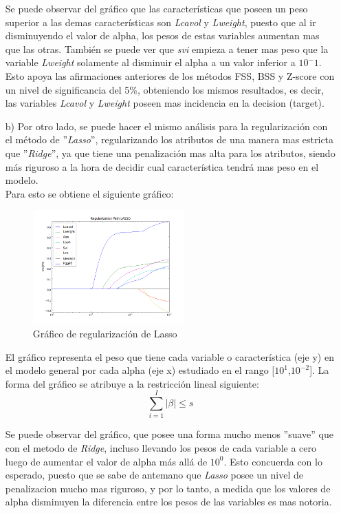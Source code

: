 \documentclass[10pt]{article}
\begin{document}
\begin{itemize}
Se puede observar del gráfico que las características que poseen un peso superior a las demas características son \textit{Lcavol} y \textit{Lweight}, puesto que al ir disminuyendo el valor de alpha, los pesos de estas variables aumentan mas que las otras. También se puede ver que \textit{svi} empieza a tener mas peso que la variable \textit{Lweight} solamente al disminuir el alpha a un valor inferior a $10^-1$. Esto apoya las afirmaciones anteriores de los métodos FSS, BSS y Z-score con un nivel de significancia del 5\%, obteniendo los mismos resultados, es decir, las variables \textit{Lcavol} y \textit{Lweight} poseen mas incidencia en la decision (target).


\item[b)] Por otro lado, se puede hacer el mismo análisis para la regularización con el método de ''\textit{Lasso}'', regularizando los atributos de una manera mas estricta que ''\textit{Ridge}'', ya que tiene una penalización mas alta para los atributos, siendo más riguroso a la hora de decidir cual característica tendrá mas peso en el modelo.\\

Para esto se obtiene el siguiente gráfico:
\begin{figure}[!htb]
    \centering
    \includegraphics[width=0.55\textwidth]{images/regularization_lasso}
    \caption{Gráfico de regularización de Lasso}
    \label{lasso}
\end{figure}

El gráfico representa el peso que tiene cada variable o característica (eje y) en el modelo general por cada alpha (eje x) estudiado en el rango [$10^1$,$10^{-2}$]. La forma del gráfico se atribuye a la restricción lineal siguiente: \\

\begin{equation}
\sum_{i=1}^I |\beta| \leq s
\end{equation}

Se puede observar del gráfico, que posee una forma mucho menos ''suave'' que con el metodo de \textit{Ridge}, incluso llevando los pesos de cada variable a cero luego de aumentar el valor de alpha más allá de $10^0$. Esto concuerda con lo esperado, puesto que se sabe de antemano que \textit{Lasso} posee un nivel de penalizacion mucho mas riguroso, y por lo tanto, a medida que los valores de alpha disminuyen la diferencia entre los pesos de las variables es mas notoria.\\


\end{itemize}
\end{document}
